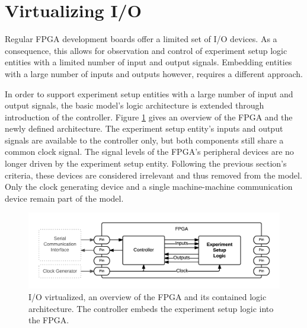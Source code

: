 \documentclass[main.tex]{subfiles}
\begin{document}
\section{Virtualizing I/O}
\label{sectionvirtualizingio}




Regular FPGA development boards offer a limited set of I/O devices. As a consequence, this allows for observation and control of experiment setup logic entities with a limited number of input and output signals. Embedding entities with a large number of inputs and outputs however, requires a different approach. 

In order to support experiment setup entities with a large number of input and output signals, the basic model's logic architecture is extended through introduction of the controller. Figure \ref{fig:fpga-inout} gives an overview of the FPGA and the newly defined architecture. The experiment setup entity's inputs and output signals are available to the controller only, but both components still share a common clock signal. The signal levels of the FPGA's peripheral devices are no longer driven by the experiment setup entity. Following the previous section's criteria, these devices are considered irrelevant and thus removed from the model. Only the clock generating device and a single machine-machine communication device remain part of the model. 


\begin{figure}[h]
\centering
\caption{I/O virtualized, an overview of the FPGA and its contained logic architecture. The controller embeds the experiment setup logic into the FPGA.}
\label{fig:fpga-inout}
\includegraphics[width=\textwidth]{img/fpga-inout}
\end{figure}
\end{document}
